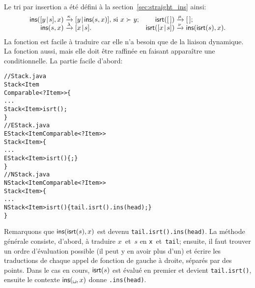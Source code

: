 Le tri par insertion a été défini à la section~\vref{sec:straight_ins}
ainsi:
\begin{equation*}
\begin{array}{@{}r@{\;}l@{\;}lr@{\;}l@{\;}l@{}}
  \fun{ins}(\cons{y}{s},x)
& \xrightarrow{\smash{\kappa}}
& \cons{y}{\fun{ins}(s,x)}, \,\text{si \(x \succ y\)};
& \fun{isrt}(\el)
& \xrightarrow{\smash{\mu}}
& \el;\\
  \fun{ins}(s,x)
& \xrightarrow{\smash{\lambda}}
& \cons{x}{s}.
& \fun{isrt}(\cons{x}{s})
& \xrightarrow{\smash{\nu}}
& \fun{ins}(\fun{isrt}(s),x).
\end{array}
\end{equation*}
La fonction  est facile à traduire car elle n'a besoin que
de la liaison dynamique. La fonction  aussi, mais elle doit
être raffinée en faisant apparaître une conditionnelle. La partie
facile d'abord:
\begin{alltt}
// Stack.java
\public \abstractX \class Stack<Item
\hfill\extends Comparable<? \super Item>> \{
  ...
  \public \abstractX Stack<Item> isrt();
\}
// EStack.java
\public \class EStack<Item \extends Comparable<? \super Item>>
       \extends Stack<Item> \{
  ...
  \public EStack<Item> isrt() \{ \return \this; \}
\}
// NStack.java
\public \class NStack<Item \extends Comparable<? \super Item>>
       \extends Stack<Item> \{
  ...
  \public NStack<Item> isrt() \{\return tail.isrt().ins(head);\}
\}
\end{alltt}
Remarquons que \(\textsf{ins}(\textsf{isrt}(s),x)\) est devenu
\texttt{tail.isrt().ins(head)}. La méthode générale consiste, d'abord,
à traduire \(x\)~et~\(s\) en \texttt{x}~et~\texttt{tail}; ensuite, il
faut trouver un ordre d'évaluation possible (il peut y en avoir plus
d'un) et écrire les traductions de chaque appel de fonction de gauche
à droite, séparés par des points. Dans le cas en cours,
\(\textsf{isrt}(s)\) est évalué en premier et devient
\texttt{tail.isrt()}, ensuite le contexte
\(\fun{ins}(\texttt{\textvisiblespace},x)\) donne
\texttt{\textvisiblespace.ins(head)}.

